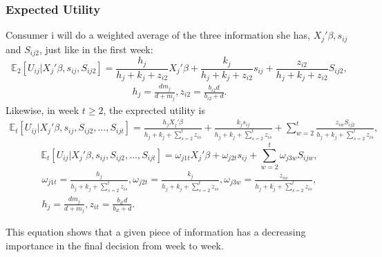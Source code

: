 \subsubsection{Expected Utility}
Consumer i will do a weighted average of the three information she has, $X_{j}'\beta, s_{i j}$ and $S_{i j 2}$, just like in the first week:
\begin{equation}
	\mathbb{E}_2[U_{i j}|X_{j}'\beta, s_{i j}, S_{i j 2}]=\frac{h_{j}}{h_{j}+k_{j}+z_{i 2}} X_{j}'\beta+\frac{k_{j}}{h_{j}+k_{j}+z_{i 2}}s_{i j}+\frac{z_{i 2}}{h_{j}+k_{j}+z_{i 2}}S_{i j 2}, 
\end{equation}
\begin{align*}
	h_{j}=\frac{d m_{j}}{d+m_{j}}, z_{i 2}=\frac{b_{i 2}d}{b_{i 2}+d}.
\end{align*}
Likewise, in week $t\geqslant2$, the exprected utility is
\begin{align*}
	\mathbb{E}_t[U_{i j}|X_{j}'\beta, s_{i j}, S_{i j 2}, ..., S_{i j t}]=\frac{h_{j}X_{j}'\beta}{h_{j}+k_{j}+\sum_{s=2}^{t}z_{i s}} +\frac{k_{j}s_{i j}}{h_{j}+k_{j}+\sum_{s=2}^{t}z_{i s}}+\sum_{w=2}^{t}\frac{z_{i w}S_{i j 2}}{h_{j}+k_{j}+\sum_{s=2}^{t}z_{i s}}, 
\end{align*}
\begin{equation}
	\mathbb{E}_t[U_{i j}|X_{j}'\beta, s_{i j}, S_{i j 2}, ..., S_{i j t}]=\omega_{j 1 t}X_{j}'\beta +\omega_{j 2 t}s_{i j}+\sum_{w=2}^{t}\omega_{j 3 w}S_{i j w}, 
\end{equation}
\begin{align*}
	\omega_{j 1 t}=\frac{h_{j}}{h_{j}+k_{j}+\sum_{s=2}^{t}z_{i s}}, 
	\omega_{j 2 t}=\frac{k_{j}}{h_{j}+k_{j}+\sum_{s=2}^{t}z_{i s}}, 
	\omega_{j 3 w}=\frac{z_{i w}}{h_{j}+k_{j}+\sum_{s=2}^{t}z_{i s}},\\
	h_{j}=\frac{d m_{j}}{d+m_{j}}, z_{i t}=\frac{b_{i t}d}{b_{i t}+d}.
\end{align*}
	
This equation shows that a given piece of information has a decreasing importance in the final decision from week to week.\\
	
